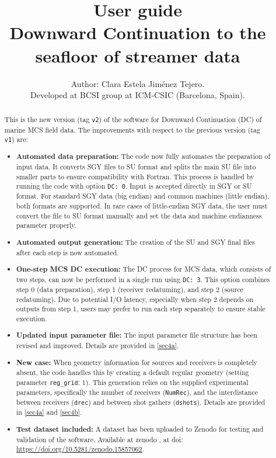 \documentclass[11pt, oneside]{article}   	%
\title{\textbf{User guide}\\Downward Continuation to the seafloor of streamer data}
\author{Author: Clara Estela Jim\'enez Tejero. \\
Developed at BCSI group at ICM-CSIC (Barcelona, Spain).}
\date{}							%
\begin{document}
\maketitle
\begin{abstract}
This is the new version (tag \texttt{v2}) of the software for Downward Continuation (DC) of marine MCS field data. The improvements with respect to the previous version (tag \texttt{v1}) are:

\begin{itemize}
    \item \textbf{Automated data preparation:} The code now fully automates the preparation of input data. It converts SGY files to SU format and splits the main SU file into smaller parts to ensure compatibility with Fortran. This process is handled by running the code with option \texttt{DC: 0}. Input is accepted directly in SGY or SU format. For standard SGY data (big endian) and common machines (little endian), both formats are supported. In rare cases of little-endian SGY data, the user must convert the file to SU format manually and set the data and machine endianness parameter properly.

    \item \textbf{Automated output generation:} The creation of the SU and SGY final files after each step is now automated.

    \item \textbf{One-step MCS DC execution:} The DC process for MCS data, which consists of two steps, can now be performed in a single run using \texttt{DC: 3}. This option combines step 0 (data preparation), step 1 (receiver redatuming), and step 2 (source redatuming). Due to potential I/O latency, especially when step 2 depends on outputs from step 1, users may prefer to run each step separately to ensure stable execution.

    \item \textbf{Updated input parameter file:} The input parameter file structure has been revised and improved. Details are provided in \ref{sec4a}.

    \item \textbf{New case:} When geometry information for sources and receivers is completely absent, the code handles this by creating a default regular geometry (setting parameter \texttt{reg\_grid}: 1). This generation relies on the supplied experimental parameters, specifically the number of receivers (\texttt{NumRec}), and the interdistance between receivers (\texttt{drec}) and between shot gathers (\texttt{dshots}). Details are provided in \ref{sec4a} and \ref{sec4b}.

    \item \textbf{Test dataset included:} A dataset has been uploaded to Zenodo for testing and validation of the software. Available at zenodo \cite{estela2}, at doi:\\ \url{https://doi.org/10.5281/zenodo.15857062}.
\end{itemize}



\end{abstract}
\end{document}
